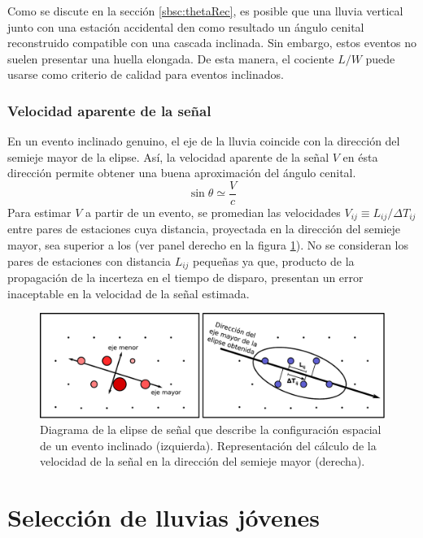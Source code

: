 		Como se discute en la sección \ref{sbsc:thetaRec}, es posible que una lluvia vertical junto con una estación accidental den como resultado un ángulo cenital reconstruido compatible con una cascada inclinada.
		Sin embargo, estos eventos no suelen presentar una huella elongada.
		De esta manera, el cociente $L/W$ puede usarse como criterio de calidad para eventos inclinados.
		
		\subsubsection{Velocidad aparente de la señal}
		En un evento inclinado genuino, el eje de la lluvia coincide con la dirección del semieje mayor de la elipse.
		Así, la velocidad aparente de la señal $V$ en ésta dirección permite obtener una buena aproximación del ángulo cenital.
		\begin{equation}
		\sin\theta \simeq \frac{V}{c}
		\end{equation}
		Para estimar $V$ a partir de un evento, se promedian las velocidades $V_{ij}\equiv L_{ij}/\Delta T_{ij}$ entre pares de estaciones cuya distancia, proyectada en la dirección del semieje mayor, sea superior a los  (ver panel derecho en la figura \ref{fig:elipse}).
		No se consideran los pares de estaciones con distancia $L_{ij}$ pequeñas ya que, producto de la propagación de la incerteza en el tiempo de disparo, presentan un error inaceptable en la velocidad de la señal estimada.
		\begin{figure}[ht]
		\begin{center}
		\includegraphics[width=1.0\textwidth]{fig/seleccionAuger/elipse.pdf}
		\caption{Diagrama de la elipse de señal que describe la configuración espacial de un evento inclinado (izquierda). Representación del cálculo de la velocidad de la señal en la dirección del semieje mayor (derecha).}
		\label{fig:elipse}
		\end{center}
		\end{figure}

\section{Selecci\'on de lluvias j\'ovenes}

